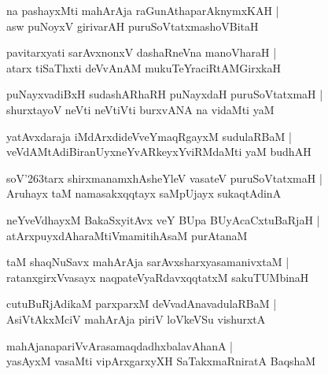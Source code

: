 \documentclass[twoside,12pt,openright]{book}
\def\S{\char'263}
\newcounter{shloka}[chapter]
\begin{document}
\begin{shloka}%
na pashayxMti mahArAja raGunAthaparAknymxKAH |\\
asw puNoyxV girivarAH puruSoVtatxmashoVBitaH 
\end{shloka}

\begin{shloka}%
pavitarxyati sarAvxnonxV dashaRneVna manoVharaH |\\
atarx tiSaThxti deVvAnAM mukuTeYraciRtAMGirxkaH 
\end{shloka}

\begin{shloka}%
puNayxvadiBxH sudashARhaRH puNayxdaH puruSoVtatxmaH |\\
shurxtayoV neVti neVtiVti burxvANA na vidaMti yaM 
\end{shloka}

\begin{shloka}%
yatAvxdaraja iMdArxdideVveYmaqRgayxM sudulaRBaM |\\
veVdAMtAdiBiranUyxneYvARkeyxYviRMdaMti yaM budhAH 
\end{shloka}

\begin{shloka}%
soV\S tarx shirxmanamxhAsheYleV vasateV puruSoVtatxmaH |\\
Aruhayx taM namasakxqqtayx saMpUjayx sukaqtAdinA
\end{shloka}

\begin{shloka}%
neYveVdhayxM BakaSxyitAvx veY BUpa BUyAcaCxtuBaRjaH |\\
atArxpuyxdAharaMtiVmamitihAsaM purAtanaM 
\end{shloka}

\begin{shloka}%
taM shaqNuSavx mahArAja sarAvxsharxyasamanivxtaM |\\
ratanxgirxVvasayx naqpateVyaRdavxqqtatxM sakuTUMbinaH 
\end{shloka}

\begin{shloka}%
cutuBuRjAdikaM parxparxM deVvadAnavadulaRBaM |\\
AsiVtAkxMciV mahArAja piriV loVkeVSu vishurxtA
\end{shloka}

\begin{shloka}%
mahAjanapariVvArasamaqdadhxbalavAhanA |\\
yasAyxM vasaMti vipArxgarxyXH SaTakxmaRniratA BaqshaM 
\end{shloka}
\end{document}
